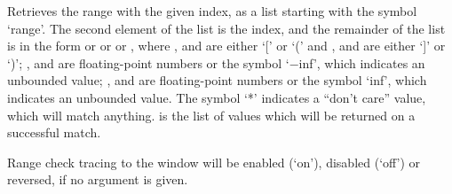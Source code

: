   Retrieves the range with the given index, as a list starting with the symbol `range'.
  The second element of the list is the index, and the remainder of the list is in the form
   or   or   or , where ,  and 
  are either `[' or `(' and ,  and  are either `]' or `)';
  ,  and  are floating-point numbers or the symbol `$-$inf',
  which indicates an unbounded value; ,  and  are floating-point numbers or
  the symbol `inf', which indicates an unbounded value.
  The symbol `*' indicates a ``don't care'' value, which will match anything.
   is the list of values which will be returned on a successful match.

  Range check tracing to the \MaxName{} window will be enabled (`on'), disabled (`off') or reversed,
  if no argument is given.
  
  \objListCmdEnd

\objItemFile[]

